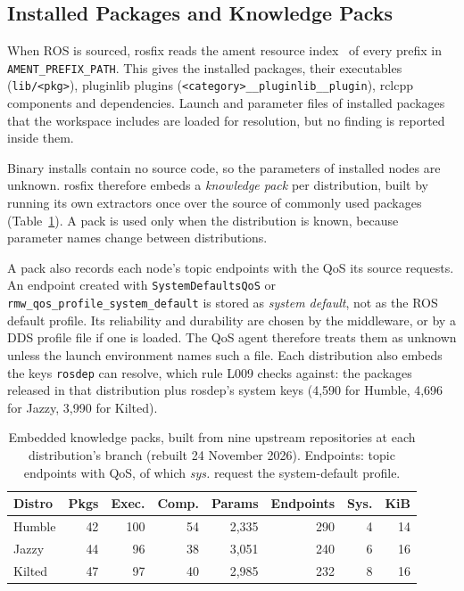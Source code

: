 \documentclass[conference]{IEEEtran}
\newcommand{\code}[1]{\texttt{#1}}
\begin{document}
\subsection{Installed Packages and Knowledge Packs}
\label{sec:installed}

When ROS is sourced, rosfix reads the ament resource index~\cite{ament_index} of every prefix in
\code{AMENT\_PREFIX\_PATH}. This gives the installed packages, their executables
(\code{lib/<pkg>}), pluginlib plugins (\code{<category>\_\_pluginlib\_\_plugin}), rclcpp
components and dependencies. Launch and parameter files of installed packages that the workspace
includes are loaded for resolution, but no finding is reported inside them.

Binary installs contain no source code, so the parameters of installed nodes are unknown. rosfix
therefore embeds a \emph{knowledge pack} per distribution, built by running its own extractors
once over the source of commonly used packages (Table~\ref{tab:packs}). A pack is used only when
the distribution is known, because parameter names change between distributions.

A pack also records each node's topic endpoints with the QoS its source requests. An endpoint
created with \code{SystemDefaultsQoS} or \code{rmw\_qos\_profile\_system\_default} is stored as
\emph{system default}, not as the ROS default profile. Its reliability and durability are chosen
by the middleware, or by a DDS profile file if one is loaded. The QoS agent therefore treats them
as unknown unless the launch environment names such a file. Each distribution also embeds the
keys \code{rosdep} can resolve, which rule L009 checks against: the packages released in that
distribution plus rosdep's system keys (4{,}590 for Humble, 4{,}696 for Jazzy, 3{,}990 for
Kilted).

\begin{table}[t]
\centering
\caption{Embedded knowledge packs, built from nine upstream repositories at each distribution's
branch (rebuilt 24 November 2026). Endpoints: topic endpoints with QoS, of which
\emph{sys.} request the system-default profile.}
\label{tab:packs}
\footnotesize
\setlength{\tabcolsep}{4pt}
\begin{tabular}{@{}lrrrrrrr@{}}
\toprule
Distro & Pkgs & Exec. & Comp. & Params & Endpoints & Sys. & KiB\\
\midrule
Humble & 42 & 100 & 54 & 2{,}335 & 290 & 4 & 14\\
Jazzy  & 44 &  96 & 38 & 3{,}051 & 240 & 6 & 16\\
Kilted & 47 &  97 & 40 & 2{,}985 & 232 & 8 & 16\\
\bottomrule
\end{tabular}
\end{table}
\end{document}
